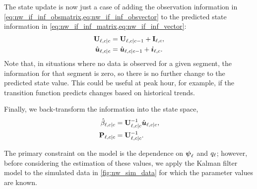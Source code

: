 The state update is now just a case of adding the observation information in \cref{eq:nw_if_inf_obsmatrix,eq:nw_if_inf_obsvector} to the predicted state information in \cref{eq:nw_if_inf_matrix,eq:nw_if_inf_vector}:
\begin{equation}
\label{eq:nw_if_update}
\begin{split}
\mathbf{U}_{\ell,c|c} &= \mathbf{U}_{\ell,c|c-1} + \mathbf{I}_{\ell,c}, \\
\hat{\boldsymbol{u}}_{\ell,c|c} &= \hat{\boldsymbol{u}}_{\ell,c|c-1} + \boldsymbol{i}_{\ell,c}.
\end{split}
\end{equation}
Note that, in situations where no data is observed for a given segment, the information for that segment is zero, so there is no further change to the predicted state value. This could be useful at peak hour, for example, if the transition function predicts changes based on historical trends.


Finally, we back-transform the information into the state space,
\begin{equation}
\label{eq:nw_if_statespace}
\begin{split}
\hat{\beta}_{\ell,c|c} &= \mathbf{U}_{\ell,c|c}^{-1} \hat{\boldsymbol{u}}_{\ell,c|c}, \\
\mathbf{P}_{\ell,c|c} &= \mathbf{U}_{\ell,c|c}^{-1}.
\end{split}
\end{equation}

The primary constraint on the model is the dependence on $\mathbf{\boldsymbol{\psi}}_{\ell}$ and $q_{\ell}$; however, before considering the estimation of these values, we apply the Kalman filter model to the simulated data in \cref{fig:nw_sim_data} for which the parameter values are known.


